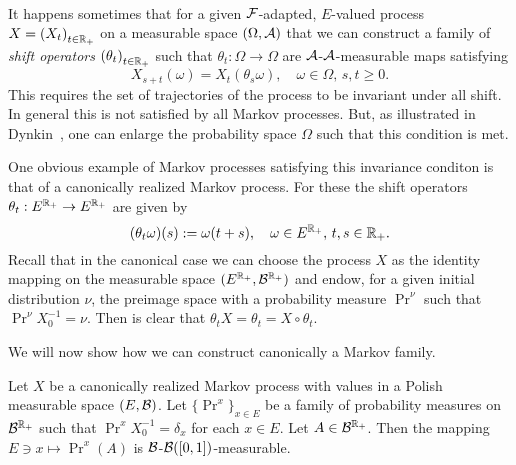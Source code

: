 \documentclass[../Master.tex]{subfiles}
\begin{document}
\

It happens sometimes that for a given \(\mathcal{F}\)-adapted, \(E\)-valued process \(X = {(X_t)}_{t \in \mathbb{R}_+}\) on a measurable space \((\Omega, \mathcal{A})\) that we can construct a family of \emph{shift operators} \({(\theta_t)}_{t \in \mathbb{R}_+}\) such that \(\theta_t: \Omega \to \Omega{}\) are \(\mathcal{A}\)-\(\mathcal{A}\)-measurable maps satisfying
\begin{equation}\label{eq:shift_operator}
 X_{s + t}(\omega) = X_t(\theta_s \omega), \quad \omega \in \Omega, \, s,t \ge 0.
\end{equation}
This requires the set of trajectories of the process to be invariant under all shift. In general this is not satisfied by all Markov processes. But, as illustrated in Dynkin~\cite*[p. 79]{dynkin_markov_1965}, one can enlarge the probability space \(\Omega{}\) such that this condition is met.

One obvious example of Markov processes satisfying this invariance conditon is that of a canonically realized Markov process. For these the shift operators  \(\theta_t : E^{\mathbb{R}_+} \to E^{\mathbb{R}_+}\) are given by 
\begin{equation}\label{eq:canonical_shift_operator}
  (\theta_t \omega) (s) := \omega(t + s), \quad \omega \in E^{\mathbb{R}_+}, \, t,s \in \mathbb{R}_+.
\end{equation}
Recall that in the canonical case we can choose the process \(X\) as the identity mapping on the measurable space \((E^{\mathbb{R}_+}, \mathcal{B}^{\mathbb{R}_+})\) and endow, for a given initial distribution \(\nu{}\), the preimage space with a probability measure \(\Pr^\nu{}\) such that \(\Pr^\nu X_0^{-1} = \nu{}\). Then is clear that \(\theta_t X = \theta_t = X \circ \theta_t\).

We will now show how we can construct canonically a Markov family.

\begin{lemma}
  Let \(X\) be a canonically realized Markov process with values in a Polish measurable space \((E, \mathcal{B})\). Let \({\{\Pr^x\}}_{x \in E}\) be a family of probability measures on \(\mathcal{B}^{\mathbb{R}_+}\) such that \(\Pr^x X_0^{-1} = \delta_x\) for each \(x \in E\). Let \(A \in \mathcal{B}^{\mathbb{R}_+}\). Then the mapping \(E \ni x \mapsto \Pr^x(A)\) is \(\mathcal{B}\)-\(\mathcal{B}([0,1])\)-measurable.
\end{lemma}
\end{document}
